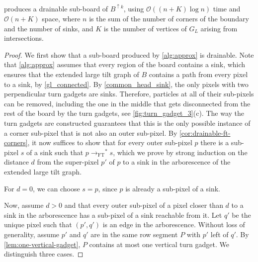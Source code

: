 \documentclass[a4paper,UKenglish,cleveref,thm-restate]{lipics-v2021}
\newcommand{\FT}{\ensuremath{\mathrm{FT}}\xspace}
\newcommand{\rOne}[1][M]{\ensuremath{\rightarrow_{#1}}}
\newcommand{\rStar}[1][M]{\rOne[#1]^*}
\newcommand{\bScale}[2][k]{\ensuremath{{#2}^{\uparrow {#1}}}}
\newcommand{\BigO}{\mathcal{O}}
\begin{document}
\begin{theorem}\label{approx_feasible}
 produces a drainable sub-board of
$\bScale{B}$, using $\BigO((n + K) \log n)$ time and $\BigO(n+K)$ space, where $n$ is
the sum of the number of corners of the boundary and the number of sinks, and
$K$ is the number of vertices of $G_L$ arising from intersections.
\end{theorem}
\begin{proof}
We first show that a sub-board produced by \cref{alg:approx} is drainable. Note
that \cref{alg:approx} assumes that every region of the board contains a sink,
which ensures that the extended large tilt graph of $B$ contains a path from
every pixel to a sink, by \cref{gl_connected}. By \cref{common_head_sink}, the
only pixels with two perpendicular turn gadgets are sinks. Therefore, particles
at all of their sub-pixels can be removed, including the one in the middle that
gets disconnected from the rest of the board by the turn gadgets,
see \cref{fig:turn_gadget_3}(c). The way the turn gadgets are constructed
guarantees that this is the only possible instance of a corner sub-pixel that is
not also an outer sub-pixel. By \cref{cor:drainable-ft-corners}, it now suffices to
show that for every outer sub-pixel $p$ there is a sub-pixel $s$ of a sink such
that \(p \rStar[\FT] s\), which we prove by strong induction on the distance $d$
from the super-pixel $p'$ of $p$ to a sink in the arborescence of the extended
large tilt graph.

For $d=0$, we can choose $s=p$, since $p$ is already a sub-pixel of a sink.

Now, assume $d>0$ and that every outer sub-pixel of a pixel closer than $d$ to a
sink in the arborescence has a sub-pixel of a sink reachable from it. Let $q'$
be the unique pixel such that $(p',q')$ is an edge in the arborescence. Without
loss of generality, assume $p'$ and $q'$ are in the same row segment $P$ with
$p'$ left of $q'$. By \cref{lem:one-vertical-gadget}, $P$ contains at most one
vertical turn gadget. We distinguish three cases.


\end{proof}
\end{document}
